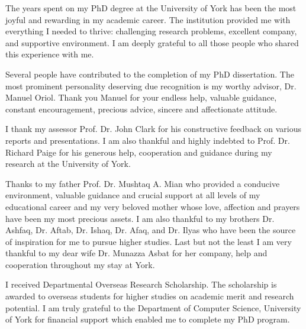 \begin{acknowledgements}
The years spent on my PhD degree at the University of York has been the most joyful and rewarding in my academic career. The institution provided me with everything I needed to thrive: challenging research problems, excellent company, and supportive environment. I am deeply grateful to all those people who shared this experience with me. 

Several people have contributed to the completion of my PhD dissertation. The most prominent personality deserving due recognition is my worthy advisor, Dr. Manuel Oriol. Thank you Manuel for your endless help, valuable guidance, constant encouragement, precious advice, sincere and affectionate attitude.

I thank my assessor Prof. Dr. John Clark for his constructive feedback on various reports and presentations. I am also thankful and highly indebted to Prof. Dr. Richard Paige for his generous help, cooperation and guidance during my research at the University of York.

Thanks to my father Prof. Dr. Mushtaq A. Mian who provided a conducive environment, valuable guidance and crucial support at all levels of my educational career and my very beloved mother whose love, affection and prayers have been my most precious assets. I am also thankful to my brothers Dr. Ashfaq, Dr. Aftab, Dr. Ishaq, Dr. Afaq, and Dr. Ilyas who have been the source of inspiration for me to pursue higher studies. Last but not the least I am very thankful to my dear wife Dr. Munazza Asbat for her company, help and cooperation throughout my stay at York.

I received Departmental Overseas Research Scholarship. The scholarship is awarded to overseas students for higher studies on academic merit and research potential. I am truly grateful to the Department of Computer Science, University of York for financial support which enabled me to complete my PhD program.

\end{acknowledgements}